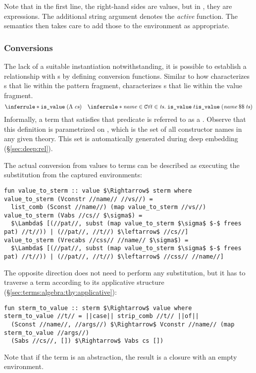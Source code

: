 \noindent
Note that in the first line, the right-hand sides are values, but in \css{}, they are expressions.
The additional string argument denotes the \emph{active} function.
The semantics then takes care to add those to the environment as appropriate.

\subsubsection{Conversions}
\label{sec:terms:types:value:conv}

The lack of a suitable  instantiation notwithstanding, it is possible to establish a relationship with s by defining conversion functions.
Similar to how  characterizes s that lie within the pattern fragment,  characterizes s that lie within the value fragment.
%
\[
  \inferrule*{
  }{\holconst{is\_value}\;(\Lambda\;\cs)} \quad
  \inferrule*{
    \mathit{name} \in \C \\
    \forall t \in \mathit{ts}.\; \holconst{is\_value}\;t
  }{\holconst{is\_value}\;(\listcomb{\mathit{name}}{\mathit{ts}})}
\]
%
\noindent
Informally, a term that satisfies that predicate is referred to as a .
Observe that this definition is parametrized on \C, which is the set of all constructor names in any given theory.
This set is automatically generated during deep embedding (§\ref{sec:deep:rel}).

The actual conversion from values to terms can be described as executing the substitution from the captured environments:
%
\begin{lstlisting}
fun value_to_sterm :: value $\Rightarrow$ sterm where
value_to_sterm (Vconstr //name// //vs//) =
  list_comb (Sconst //name//) (map value_to_sterm //vs//)
value_to_sterm (Vabs //cs// $\sigma$) =
  $\Lambda$ [(//pat//, subst (map value_to_sterm $\sigma$ $-$ frees pat) //t//)) | (//pat//, //t//) $\leftarrow$ //cs//]
value_to_sterm (Vrecabs //css// //name// $\sigma$) =
  $\Lambda$ [(//pat//, subst (map value_to_sterm $\sigma$ $-$ frees pat) //t//)) | (//pat//, //t//) $\leftarrow$ //css// //name//]
\end{lstlisting}

\noindent
The opposite direction does not need to perform any substitution, but it has to traverse a term according to its applicative structure (§\ref{sec:terms:algebra:thy:applicative}):
%
\begin{lstlisting}
fun sterm_to_value :: sterm $\Rightarrow$ value where
sterm_to_value //t// = ||case|| strip_comb //t// ||of||
  (Sconst //name//, //args//) $\Rightarrow$ Vconstr //name// (map sterm_to_value //args//)
  (Sabs //cs//, []) $\Rightarrow$ Vabs cs [])
\end{lstlisting}
%
\noindent
Note that if the term is an abstraction, the result is a closure with an empty environment.

